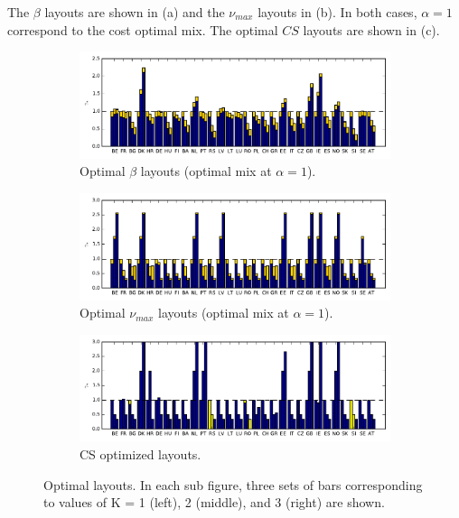 \documentclass[a4paper, 5p, sort&compress]{elsarticle}%
\newcommand{\chromowidth}{1.00 \columnwidth}
\begin{document}
The $\beta$ layouts are shown in (a) and the
$\nu_{max}$ layouts in (b). In both cases, $\alpha = 1$ correspond to the
cost optimal mix. The optimal $CS$ layouts are shown in (c).


\begin{figure}[p]
  \centering
  \begin{subfigure}{2\columnwidth}
    \includegraphics[width = \chromowidth, center]{betaLayouts}
    \caption{Optimal $\beta$ layouts (optimal mix at $\alpha = 1$).}
    \label{fig:betaOpt}    
  \end{subfigure}
  \begin{subfigure}{2\columnwidth}
    \includegraphics[width = \chromowidth, center]{cfMaxLayouts}
    \caption{Optimal $\nu_{max}$ layouts (optimal mix at $\alpha = 1$).}
    \label{fig:cfMaxOpt}    
  \end{subfigure}
  \begin{subfigure}{2\columnwidth}
    \includegraphics[width = \chromowidth, center]{csLayouts}
    \caption{CS optimized layouts.}
    \label{fig:csOpt}    
  \end{subfigure}
  \caption{Optimal layouts. In each sub figure, three sets of bars
    corresponding to values of K = 1 (left), 2 (middle), and 3 (right)
    are shown.}
  \label{fig:optLayouts}
\end{figure}
\end{document}
